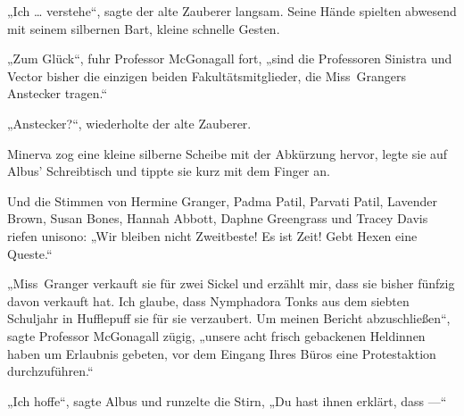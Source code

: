 „Ich … verstehe“, sagte der alte Zauberer langsam. Seine Hände spielten abwesend mit seinem silbernen Bart, kleine schnelle Gesten.

„Zum Glück“, fuhr Professor McGonagall fort, „sind die Professoren Sinistra und Vector bisher die einzigen beiden Fakultätsmitglieder, die Miss~Grangers Anstecker tragen.“

„Anstecker?“, wiederholte der alte Zauberer.

Minerva zog eine kleine silberne Scheibe mit der Abkürzung \SPHEW hervor, legte sie auf Albus’ Schreibtisch und tippte sie kurz mit dem Finger an.

Und die Stimmen von Hermine Granger, Padma Patil, Parvati Patil, Lavender Brown, Susan Bones, Hannah Abbott, Daphne Greengrass und Tracey Davis riefen unisono:
„Wir bleiben nicht Zweitbeste! Es ist Zeit! Gebt Hexen eine Queste.“

„Miss~Granger verkauft sie für zwei Sickel und erzählt mir, dass sie bisher fünfzig davon verkauft hat. Ich glaube, dass Nymphadora Tonks aus dem siebten Schuljahr in Hufflepuff sie für sie verzaubert. Um meinen Bericht abzuschließen“, sagte Professor McGonagall zügig, „unsere acht frisch gebackenen Heldinnen haben um Erlaubnis gebeten, vor dem Eingang Ihres Büros eine Protestaktion durchzuführen.“

„Ich hoffe“, sagte Albus und runzelte die Stirn,
„Du hast ihnen erklärt, dass —“

